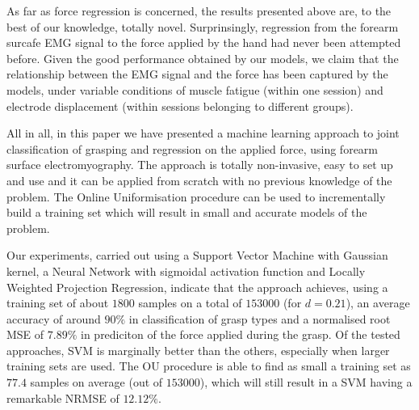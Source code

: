 As far as force regression is concerned, the results presented above
are, to the best of our knowledge, totally novel. Surprinsingly,
regression from the forearm surcafe EMG signal to the force applied by
the hand had never been attempted before. Given the good performance
obtained by our models, we claim that the relationship between the EMG
signal and the force has been captured by the models, under variable
conditions of muscle fatigue (within one session) and electrode
displacement (within sessions belonging to different groups).

All in all, in this paper we have presented a machine learning
approach to joint classification of grasping and regression on the
applied force, using forearm surface electromyography. The approach is
totally non-invasive, easy to set up and use and it can be applied
from scratch with no previous knowledge of the problem. The Online
Uniformisation procedure can be used to incrementally build a training
set which will result in small and accurate models of the problem.

Our experiments, carried out using a Support Vector Machine with
Gaussian kernel, a Neural Network with sigmoidal activation function
and Locally Weighted Projection Regression, indicate that the approach
achieves, using a training set of about $1800$ samples on a total of
$153000$ (for $d=0.21$), an average accuracy of around $90\%$ in
classification of grasp types and a normalised root MSE of $7.89\%$ in
prediciton of the force applied during the grasp. Of the tested
approaches, SVM is marginally better than the others, especially when
larger training sets are used. The OU procedure is able to find as
small a training set as $77.4$ samples on average (out of $153000$),
which will still result in a SVM having a remarkable NRMSE of
$12.12\%$.

